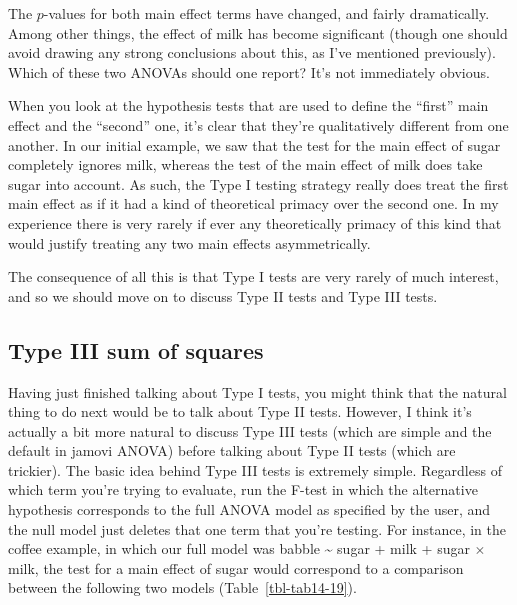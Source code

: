 \documentclass[
  a4paper,
]{book}
\begin{document}
The \(p\)-values for both main effect terms have changed, and fairly
dramatically. Among other things, the effect of milk has become
significant (though one should avoid drawing any strong conclusions
about this, as I've mentioned previously). Which of these two ANOVAs
should one report? It's not immediately obvious.

When you look at the hypothesis tests that are used to define the
``first'' main effect and the ``second'' one, it's clear that they're
qualitatively different from one another. In our initial example, we saw
that the test for the main effect of sugar completely ignores milk,
whereas the test of the main effect of milk does take sugar into
account. As such, the Type I testing strategy really does treat the
first main effect as if it had a kind of theoretical primacy over the
second one. In my experience there is very rarely if ever any
theoretically primacy of this kind that would justify treating any two
main effects asymmetrically.

The consequence of all this is that Type I tests are very rarely of much
interest, and so we should move on to discuss Type II tests and Type III
tests.

\hypertarget{type-iii-sum-of-squares}{%
\subsection{Type III sum of squares}\label{type-iii-sum-of-squares}}

Having just finished talking about Type I tests, you might think that
the natural thing to do next would be to talk about Type II tests.
However, I think it's actually a bit more natural to discuss Type III
tests (which are simple and the default in jamovi ANOVA) before talking
about Type II tests (which are trickier). The basic idea behind Type III
tests is extremely simple. Regardless of which term you're trying to
evaluate, run the F-test in which the alternative hypothesis corresponds
to the full ANOVA model as specified by the user, and the null model
just deletes that one term that you're testing. For instance, in the
coffee example, in which our full model was babble \textasciitilde{}
sugar + milk + sugar \(\times\) milk, the test for a main effect of
sugar would correspond to a comparison between the following two models
(Table~\ref{tbl-tab14-19}).

\hypertarget{tbl-tab14-19}{}
 
  \providecommand{\huxb}[2]{\arrayrulecolor[RGB]{#1}\global\arrayrulewidth=#2pt}
  \providecommand{\huxvb}[2]{\color[RGB]{#1}\vrule width #2pt}
  \providecommand{\huxtpad}[1]{\rule{0pt}{#1}}
  \providecommand{\huxbpad}[1]{\rule[-#1]{0pt}{#1}}
\end{document}
